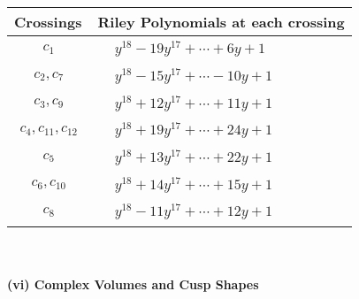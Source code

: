 \documentclass[1p]{elsarticle_modified}
\theoremstyle{definition}
\begin{document}
\begin{tabular}{m{50pt}|m{274pt}}
Crossings & \hspace{64pt}Riley Polynomials at each crossing \\
\hline $$\begin{aligned}c_{1}\end{aligned}$$&$\begin{aligned}
&y^{18}-19 y^{17}+\cdots+6 y+1
\end{aligned}$\\
\hline $$\begin{aligned}c_{2},c_{7}\end{aligned}$$&$\begin{aligned}
&y^{18}-15 y^{17}+\cdots-10 y+1
\end{aligned}$\\
\hline $$\begin{aligned}c_{3},c_{9}\end{aligned}$$&$\begin{aligned}
&y^{18}+12 y^{17}+\cdots+11 y+1
\end{aligned}$\\
\hline $$\begin{aligned}c_{4},c_{11},c_{12}\end{aligned}$$&$\begin{aligned}
&y^{18}+19 y^{17}+\cdots+24 y+1
\end{aligned}$\\
\hline $$\begin{aligned}c_{5}\end{aligned}$$&$\begin{aligned}
&y^{18}+13 y^{17}+\cdots+22 y+1
\end{aligned}$\\
\hline $$\begin{aligned}c_{6},c_{10}\end{aligned}$$&$\begin{aligned}
&y^{18}+14 y^{17}+\cdots+15 y+1
\end{aligned}$\\
\hline $$\begin{aligned}c_{8}\end{aligned}$$&$\begin{aligned}
&y^{18}-11 y^{17}+\cdots+12 y+1
\end{aligned}$\\
\hline
\end{tabular}\\~\\
\newpage\flushleft \textbf{(vi) Complex Volumes and Cusp Shapes}
\end{document}
